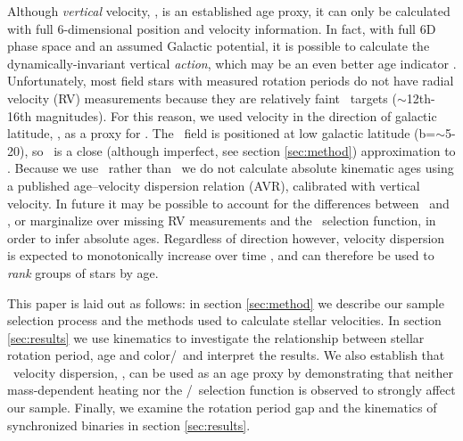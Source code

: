 Although {\it vertical} velocity, \vz, is an established age proxy, it can
only be calculated with full 6-dimensional position and velocity information.
In fact, with full 6D phase space and an assumed Galactic potential, it is
possible to calculate the dynamically-invariant vertical {\it action}, which may
be an even better age indicator \citep{beane2018, ting2019}.
Unfortunately, most field stars with measured rotation periods do not have
radial velocity (RV) measurements because they are relatively faint \kepler\
targets ($\sim$12th-16th magnitudes).
For this reason, we used velocity in the direction of galactic latitude, \vb,
as a proxy for \vz.
The \kepler\ field is positioned at low galactic latitude
(b=$\sim$5-20\degrees), so \vb\ is a close (although imperfect, see section
\ref{sec:method}) approximation to \vz.
Because we use \vb\ rather than \vz\, we do not calculate absolute kinematic
ages using a published age--velocity dispersion relation (AVR), calibrated with
vertical velocity.
In future it may be possible to account for the differences between \vb\ and
\vz, or marginalize over missing RV measurements and the \kepler\ selection
function, in order to infer absolute ages.
Regardless of direction however, velocity dispersion is expected to
monotonically increase over time \citep[\eg][]{holmberg2009}, and can
therefore be used to {\it rank} groups of stars by age.

This paper is laid out as follows: in section \ref{sec:method} we describe our
sample selection process and the methods used to calculate stellar
velocities.
In section \ref{sec:results} we use kinematics to investigate the relationship
between stellar rotation period, age and color/\teff\ and interpret the
results.
We also establish that \vb\ velocity dispersion, \sigmavb, can be used as an
age proxy by demonstrating that neither mass-dependent heating nor the
\kepler/\gaia\ selection function is observed to strongly affect our sample.
Finally, we examine the rotation period gap and the kinematics of synchronized
binaries in section \ref{sec:results}.

